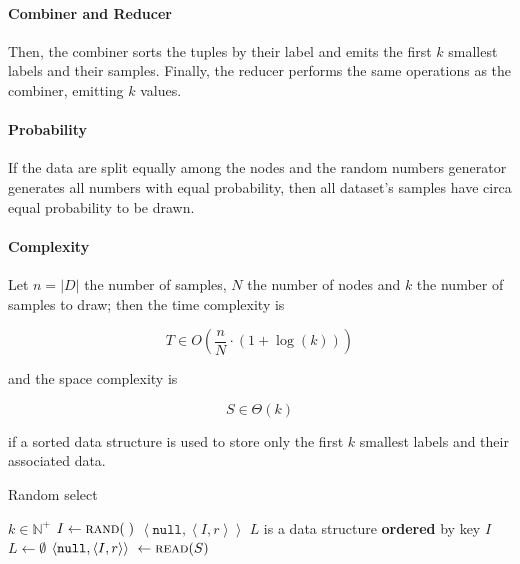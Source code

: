 \documentclass[parskip=full]{report}
\begin{document}
\paragraph{Combiner and Reducer}
Then, the combiner sorts the tuples by their label and emits the first $k$ 
smallest labels and their samples. Finally, the reducer performs the same 
operations as the combiner, emitting $k$ values.

\paragraph{Probability}
If the data are split equally among the nodes and the random numbers generator generates all numbers with equal probability, then all dataset's samples have circa equal probability to be drawn.

\paragraph{Complexity}
Let $n = |D|$ the number of samples, $N$ the number of nodes and $k$ the number of samples to draw; then the time complexity is

\[
T \in O \left(\dfrac{n}{N} \cdot \left(1 + \log(k)\right)\right)
\] 

and the space complexity is

\[
S \in \Theta \left(k\right)
\]

if a sorted data structure is used to store only the first $k$ smallest labels 
and their associated data.

\begin{algorithm}[H]
	\caption{Random select}\label{alg:random_map}
	\begin{algorithmic}
		\Require $k \in \mathbb{N}^+$
			\State $I \gets \Call{rand}{\;}$
			\State \Return $\left< \texttt{null}, \left< I, r\right> \right>$
		\EndProcedure
		\vspace{.25cm}
			\State $L$ is a data structure \textbf{ordered} by key $I$
			\State $L \gets \emptyset$
				\State $\left< \texttt{null}, \left< I, r\right> \right> \
					\gets \Call{read}{S}$
				\State {}
					\State {}
				\EndIf
				
				\State {}
			\EndWhile
				\State {}
			\EndFor
		\EndProcedure
		\vspace{.25cm}
			\State {} 
		\EndProcedure
	\end{algorithmic}
\end{algorithm}
\end{document}
